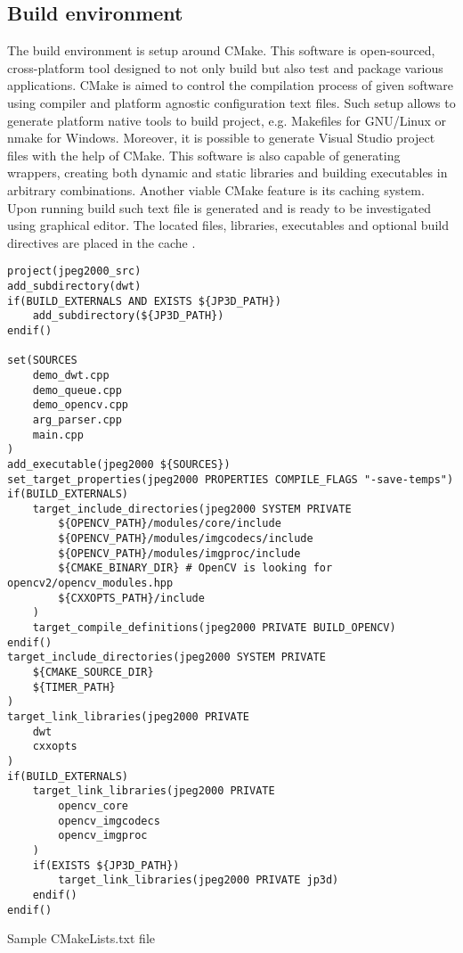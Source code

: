 \subsection{Build environment}

The build environment is setup around CMake. This software is open-sourced, cross-platform tool
designed to not only build but also test and package various applications. CMake is aimed to
control the compilation process of given software using compiler and platform agnostic configuration
text files. Such setup allows to generate platform native tools to build project, e.g. Makefiles
for GNU/Linux or nmake for Windows. Moreover, it is possible to generate Visual Studio project
files with the help of CMake. This software is also capable of generating wrappers, creating
both dynamic and static libraries and building executables in arbitrary combinations. Another
viable CMake feature is its caching system. Upon running build such text file is generated
and is ready to be investigated using graphical editor. The located files, libraries, executables
and optional build directives are placed in the cache \cite{cmake}.

\begin{listing}[htb]
\begin{verbatim}
project(jpeg2000_src)
add_subdirectory(dwt)
if(BUILD_EXTERNALS AND EXISTS ${JP3D_PATH})
    add_subdirectory(${JP3D_PATH})
endif()

set(SOURCES
    demo_dwt.cpp
    demo_queue.cpp
    demo_opencv.cpp
    arg_parser.cpp
    main.cpp
)
add_executable(jpeg2000 ${SOURCES})
set_target_properties(jpeg2000 PROPERTIES COMPILE_FLAGS "-save-temps")
if(BUILD_EXTERNALS)
    target_include_directories(jpeg2000 SYSTEM PRIVATE
        ${OPENCV_PATH}/modules/core/include
        ${OPENCV_PATH}/modules/imgcodecs/include
        ${OPENCV_PATH}/modules/imgproc/include
        ${CMAKE_BINARY_DIR} # OpenCV is looking for opencv2/opencv_modules.hpp
        ${CXXOPTS_PATH}/include
    )
    target_compile_definitions(jpeg2000 PRIVATE BUILD_OPENCV)
endif()
target_include_directories(jpeg2000 SYSTEM PRIVATE
    ${CMAKE_SOURCE_DIR}
    ${TIMER_PATH}
)
target_link_libraries(jpeg2000 PRIVATE
    dwt
    cxxopts
)
if(BUILD_EXTERNALS)
    target_link_libraries(jpeg2000 PRIVATE
        opencv_core
        opencv_imgcodecs
        opencv_imgproc
    )
    if(EXISTS ${JP3D_PATH})
        target_link_libraries(jpeg2000 PRIVATE jp3d)
    endif()
endif()
\end{verbatim}
\caption{Sample CMakeLists.txt file}
\label{lst:sample_cmake_file}
\end{listing}

